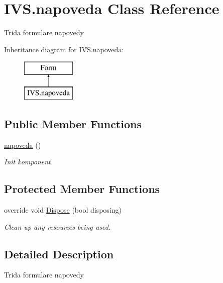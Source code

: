 \hypertarget{class_i_v_s_1_1napoveda}{}\section{I\+V\+S.\+napoveda Class Reference}
\label{class_i_v_s_1_1napoveda}


Trida formulare napovedy  


Inheritance diagram for I\+V\+S.\+napoveda\+:\begin{figure}[H]
\begin{center}
\leavevmode
\includegraphics[height=2.000000cm]{class_i_v_s_1_1napoveda}
\end{center}
\end{figure}
\subsection*{Public Member Functions}
\begin{DoxyCompactItemize}
\item 
\mbox{\hyperlink{class_i_v_s_1_1napoveda_a97471343e0e827c2f75fc4c64937f515}{napoveda}} ()
\begin{DoxyCompactList}\small\item\em Init komponent \end{DoxyCompactList}\end{DoxyCompactItemize}
\subsection*{Protected Member Functions}
\begin{DoxyCompactItemize}
\item 
override void \mbox{\hyperlink{class_i_v_s_1_1napoveda_aeec632e7bb98b05061ff7ab39373ef4b}{Dispose}} (bool disposing)
\begin{DoxyCompactList}\small\item\em Clean up any resources being used. \end{DoxyCompactList}\end{DoxyCompactItemize}


\subsection{Detailed Description}
Trida formulare napovedy 



